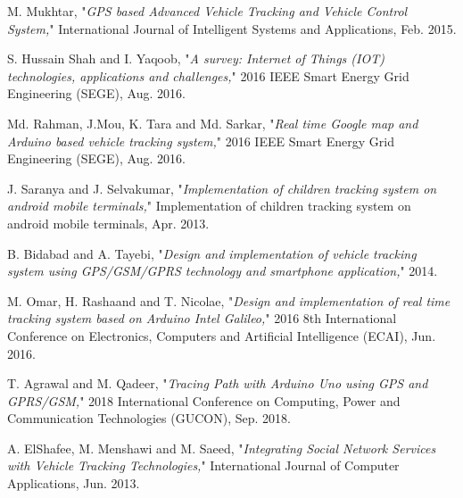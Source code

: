 \cleardoublepage
{}
{}
\begin{thebibliography}{99}
	
	M. Mukhtar, "\textit{{GPS} based Advanced Vehicle Tracking and Vehicle Control System,}" International Journal of Intelligent Systems and Applications, Feb. 2015.
	
	S. Hussain Shah and I. Yaqoob, "\textit{A survey: Internet of Things ({IOT}) technologies,  applications and challenges,}" 2016 {IEEE} Smart Energy Grid Engineering ({SEGE}), Aug. 2016.
	
	
	Md. Rahman, J.Mou, K. Tara and Md. Sarkar, "\textit{Real time Google map and Arduino based vehicle tracking system,}" 2016 {IEEE} Smart Energy Grid Engineering ({SEGE}), Aug. 2016.
	
	
	J. Saranya and J. Selvakumar, "\textit{Implementation of children tracking system on android mobile terminals,}" Implementation of children tracking system on android mobile terminals, Apr. 2013.
	
	B. Bidabad and A. Tayebi, "\textit{Design and implementation of vehicle tracking system using GPS/GSM/GPRS technology and smartphone application,}" 2014.
	
	M. Omar, H. Rashaand and T. Nicolae, "\textit{Design and implementation of real time tracking system based on Arduino Intel Galileo,}" 2016 8th International Conference on Electronics,  Computers and Artificial Intelligence ({ECAI}), Jun. 2016.

	T. Agrawal and M. Qadeer, "\textit{Tracing Path with Arduino Uno using {GPS} and {GPRS}/{GSM},}" 2018 International Conference on Computing,  Power and Communication Technologies ({GUCON}), Sep. 2018.
	
	A. ElShafee, M. Menshawi and M. Saeed, "\textit{Integrating Social Network Services with Vehicle Tracking Technologies,}" International Journal of Computer Applications, Jun. 2013.
	
\end{thebibliography}